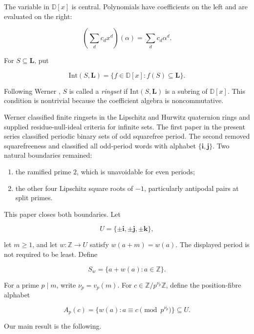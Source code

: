 \documentclass[11pt]{article}
\numberwithin{equation}{section}
\begin{document}
The variable in $\mathbb D[x]$ is central. Polynomials have coefficients on
the left and are evaluated on the right:

\nopagebreak[4]
\[
\left(\sum_d c_dx^d\right)(\alpha)=\sum_dc_d\alpha^d.
\]

For $S\subseteq\mathbf L$, put

\nopagebreak[4]
\[
\mathrm{Int}(S,\mathbf L)
=\{f\in\mathbb D[x]:f(S)\subseteq\mathbf L\}.
\]

Following Werner \cite{werner2026}, $S$ is called a \emph{ringset} if
$\mathrm{Int}(S,\mathbf L)$ is a subring of $\mathbb D[x]$. This
condition is nontrivial because the coefficient algebra is noncommutative.

Werner \cite{werner2026} classified finite ringsets in the Lipschitz and Hurwitz
quaternion rings and supplied residue-null-ideal criteria for infinite sets.
The first paper in the present series \cite{carptopus-squarefree} classified periodic binary sets of
odd squarefree period. The second \cite{carptopus-odd} removed squarefreeness and classified
all odd-period words with alphabet $\{\mathbf i,\mathbf j\}$. Two natural
boundaries remained:

\begin{enumerate}
\item the ramified prime $2$, which is unavoidable for even periods;
\item the other four Lipschitz square roots of $-1$, particularly antipodal
pairs at split primes.

\end{enumerate}

This paper closes both boundaries. Let

\nopagebreak[4]
\[
U=\{\pm\mathbf i,\pm\mathbf j,\pm\mathbf k\},
\]

let $m\ge1$, and let $w:\mathbb Z\to U$ satisfy $w(a+m)=w(a)$. The displayed
period is not required to be least. Define

\nopagebreak[4]
\[
S_w=\{a+w(a):a\in\mathbb Z\}.
\]

For a prime $p\mid m$, write $\nu_p=v_p(m)$. For
$c\in\mathbb Z/p^{\nu_p}\mathbb Z$, define the position-fibre alphabet

\nopagebreak[4]
\[
A_p(c)
=\{w(a):a\equiv c\pmod {p^{\nu_p}}\}\subseteq U.
\]

Our main result is the following.
\end{document}

